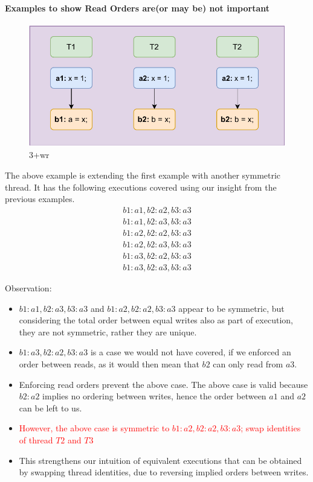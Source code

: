     \paragraph{Examples to show Read Orders are(or may be) not important}

        \begin{figure}[H]
            \centering 
            \includegraphics[scale=0.7]{Example3(3+wr).pdf}
            \caption{3+wr}
        \end{figure}


        The above example is extending the first example with another symmetric thread. It has the following executions covered using our insight from the previous examples. 
        \begin{align*}
            b1:a1 , b2:a2 , b3:a3 \\
            b1:a1 , b2:a3 , b3:a3 \\
            b1:a2 , b2:a2 , b3:a3 \\
            b1:a2 , b2:a3 , b3:a3 \\
            b1:a3 , b2:a2 , b3:a3 \\
            b1:a3 , b2:a3 , b3:a3
        \end{align*}

        Observation:
        \begin{itemize}
            \item $b1:a1 , b2:a3 , b3:a3$ and $b1:a2 , b2:a2 , b3:a3$ appear to be symmetric, but considering the total order between equal writes also as part of execution, they are not symmetric, rather they are unique. 
            \item  $b1:a3 , b2:a2 , b3:a3$ is a case we would not have covered, if we enforced an order between reads, as it would then mean that $b2$ can only read from $a3$. 
            \item Enforcing read orders prevent the above case. The above case is valid because $b2:a2$ implies no ordering between writes, hence the order between $a1$ and $a2$ can be left to us. 
            \item \textcolor{red}{However, the above case is symmetric to $b1:a2 , b2:a2 , b3:a3$; swap identities of thread $T2$ and $T3$}
            \item This strengthens our intuition of equivalent executions that can be obtained by swapping thread identities, due to reversing implied orders between writes. 
        \end{itemize}

